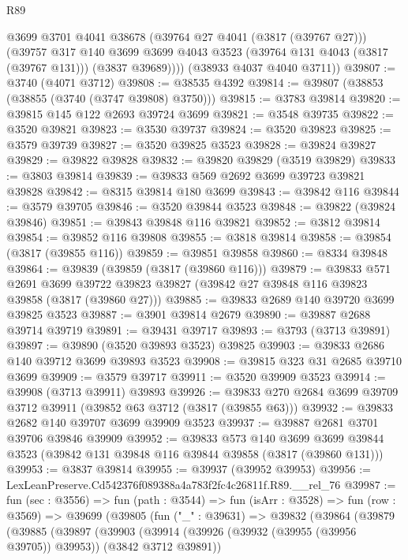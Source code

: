 \begin{lexlean}{R89}
\begin{coremodule}
          @3699
          @3701
          @4041
          @38678
          (@39764 @27 @4041 (@3817 (@39767 @27)))
          (@39757
            @317
            @140
            @3699
            @3699
            @4043
            @3523
            (@39764 @131 @4043 (@3817 (@39767 @131)))
            (@3837 @39689))))
      (@38933 @4037 @4040 @3711))
@39807 := @3740 (@4071 @3712)
@39808 := @38535 @4392
@39814 := @39807 (@38853 (@38855 (@3740 (@3747 @39808) @3750)))
@39815 := @3783 @39814
@39820 := @39815 @145 @122 @2693 @39724 @3699
@39821 := @3548 @39735
@39822 := @3520 @39821
@39823 := @3530 @39737
@39824 := @3520 @39823
@39825 := @3579 @39739
@39827 := @3520 @39825 @3523
@39828 := @39824 @39827
@39829 := @39822 @39828
@39832 := @39820 @39829 (@3519 @39829)
@39833 := @3803 @39814
@39839 := @39833 @569 @2692 @3699 @39723 @39821 @39828
@39842 := @8315 @39814 @180 @3699
@39843 := @39842 @116
@39844 := @3579 @39705
@39846 := @3520 @39844 @3523
@39848 := @39822 (@39824 @39846)
@39851 := @39843 @39848 @116 @39821
@39852 := @3812 @39814
@39854 := @39852 @116 @39808
@39855 := @3818 @39814
@39858 := @39854 (@3817 (@39855 @116))
@39859 := @39851 @39858
@39860 := @8334 @39848
@39864 := @39839 (@39859 (@3817 (@39860 @116)))
@39879 := @39833
    @571
    @2691
    @3699
    @39722
    @39823
    @39827
    (@39842 @27 @39848 @116 @39823 @39858 (@3817 (@39860 @27)))
@39885 := @39833 @2689 @140 @39720 @3699 @39825 @3523
@39887 := @3901 @39814 @2679
@39890 := @39887 @2688 @39714 @39719
@39891 := @39431 @39717
@39893 := @3793 (@3713 @39891)
@39897 := @39890 (@3520 @39893 @3523) @39825
@39903 := @39833 @2686 @140 @39712 @3699 @39893 @3523
@39908 := @39815 @323 @31 @2685 @39710 @3699
@39909 := @3579 @39717
@39911 := @3520 @39909 @3523
@39914 := @39908 (@3713 @39911) @39893
@39926 := @39833 @270 @2684 @3699 @39709 @3712 @39911 (@39852 @63 @3712 (@3817 (@39855 @63)))
@39932 := @39833 @2682 @140 @39707 @3699 @39909 @3523
@39937 := @39887 @2681 @3701 @39706 @39846 @39909
@39952 := @39833
    @573
    @140
    @3699
    @3699
    @39844
    @3523
    (@39842 @131 @39848 @116 @39844 @39858 (@3817 (@39860 @131)))
@39953 := @3837 @39814
@39955 := @39937 (@39952 @39953)
@39956 := LexLeanPreserve.Cd542376f089388a4a783f2fc4c26811f.R89.__rel_76
@39987 := fun (sec : @3556) =>
  fun (path : @3544) =>
  fun (isArr : @3528) =>
  fun (row : @3569) =>
  @39699
    (@39805
      (fun ("_" : @39631) =>
      @39832
        (@39864
          (@39879
            (@39885
              (@39897
                (@39903
                  (@39914 (@39926 (@39932 (@39955 (@39956 @39705)) @39953)) (@3842 @3712 @39891))

\end{coremodule}
\end{lexlean}
